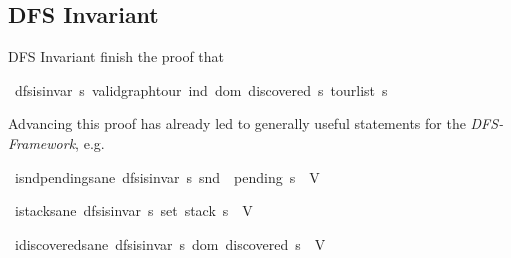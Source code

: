 \documentclass[%
	sans,
	12pt,
]{beamer}
\def\isacartoucheopen{}%
\def\isacartoucheclose{}%
\begin{document}
\subsection{DFS Invariant}
\begin{frame}{DFS Invariant}
	finish the proof that
	\vspace{-2mm}
	\begin{isabelle}
		\isamarkupfalse%
		\ {\isacartoucheopen}dfs{\isachardot}is{\isacharunderscore}invar\ {\isacharparenleft}{\isasymlambda}s{\isachardot}\ valid{\isacharunderscore}graph{\isachardot}tour\ {\isacharparenleft}ind{\isacharprime}\ {\isacharparenleft}dom\ {\isacharparenleft}discovered\ s{\isacharparenright}{\isacharparenright}{\isacharparenright}\ {\isacharparenleft}tour{\isacharunderscore}list\ s{\isacharparenright}{\isacharparenright}{\isacartoucheclose}
	\end{isabelle}\pause
	Advancing this proof has already led to generally useful statements for the \textit{DFS-Framework}, e.g.\
	\begin{isabelle}
		\isacommand{lemma}\isamarkupfalse%
		\ i{\isacharunderscore}snd{\isacharunderscore}pending{\isacharunderscore}sane{\isacharcolon}\ {\isacartoucheopen}dfs{\isachardot}is{\isacharunderscore}invar\ {\isacharparenleft}{\isasymlambda}s{\isachardot}\ snd\ {\isacharbackquote}\ {\isacharparenleft}pending\ s{\isacharparenright}\ {\isasymsubseteq}\ V{\isacharparenright}{\isacartoucheclose}
	\end{isabelle}\pause
	\begin{isabelle}
		\isamarkupfalse%
		\ i{\isacharunderscore}stack{\isacharunderscore}sane{\isacharcolon}\ {\isacartoucheopen}dfs{\isachardot}is{\isacharunderscore}invar\ {\isacharparenleft}{\isasymlambda}s{\isachardot}\ set\ {\isacharparenleft}stack\ s{\isacharparenright}\ {\isasymsubseteq}\ V{\isacharparenright}{\isacartoucheclose}
	\end{isabelle}\pause
	\begin{isabelle}
		\isamarkupfalse%
		\ i{\isacharunderscore}discovered{\isacharunderscore}sane{\isacharcolon}\ {\isacartoucheopen}dfs{\isachardot}is{\isacharunderscore}invar\ {\isacharparenleft}{\isasymlambda}s{\isachardot}\ dom\ {\isacharparenleft}discovered\ s{\isacharparenright}\ {\isasymsubseteq}\ V{\isacharparenright}{\isacartoucheclose}
	\end{isabelle}
\end{frame}
\end{document}
